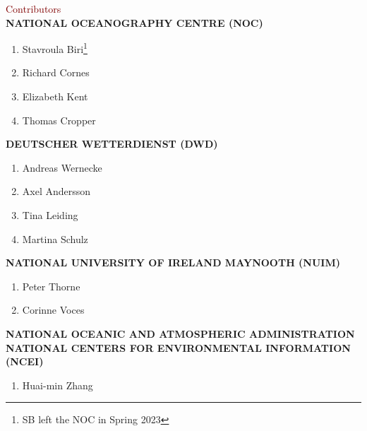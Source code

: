 \newpage

\begin{adjustwidth}{2.cm}{}
\vspace* {10mm}

{\fontsize{20}{24} \selectfont \textcolor{maroon}{Contributors}}\\

{\fontsize{14}{17} \selectfont \textbf{\uppercase{{National Oceanography Centre (NOC)}}}}
\begin{enumerate}
\item Stavroula Biri\footnote{SB left the NOC in Spring 2023}
\item Richard Cornes
\item Elizabeth Kent
\item Thomas Cropper
\end{enumerate}

{\fontsize{14}{17} \selectfont \textbf{\uppercase{Deutscher Wetterdienst (DWD)}}}
\begin{enumerate}
\item Andreas Wernecke
\item Axel Andersson
\item Tina Leiding
\item Martina Schulz
\end{enumerate}

{\fontsize{14}{17} \selectfont \textbf{\uppercase{National University of Ireland Maynooth (NUIM)}}}
\begin{enumerate}
\item Peter Thorne
\item Corinne Voces
\end{enumerate}

{\fontsize{14}{17} \selectfont \textbf{\uppercase{National Oceanic and Atmospheric Administration National Centers for Environmental Information (NCEI)}}}
\begin{enumerate}
\item Huai-min Zhang
\end{enumerate}

\end{adjustwidth}
